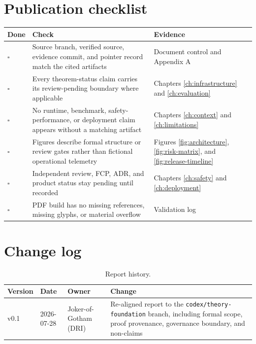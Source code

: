 \label{app:publication}

\section{Publication checklist}

\begin{table}[H]
\centering
\begin{tabularx}{\textwidth}{@{}L{0.08\textwidth}L{0.58\textwidth}Y@{}}
\toprule
{}
\textbf{Done} & \textbf{Check} & \textbf{Evidence} \\
\midrule
\(\square\) & Source branch, verified source, evidence commit, and pointer record match the cited artifacts & Document control and Appendix A \\
\(\square\) & Every theorem-status claim carries its review-pending boundary where applicable & Chapters \ref{ch:infrastructure} and \ref{ch:evaluation} \\
\(\square\) & No runtime, benchmark, safety-performance, or deployment claim appears without a matching artifact & Chapters \ref{ch:context} and \ref{ch:limitations} \\
\(\square\) & Figures describe formal structure or review gates rather than fictional operational telemetry & Figures \ref{fig:architecture}, \ref{fig:risk-matrix}, and \ref{fig:release-timeline} \\
\(\square\) & Independent review, FCP, ADR, and product status stay pending until recorded & Chapters \ref{ch:safety} and \ref{ch:deployment} \\
\(\square\) & PDF build has no missing references, missing glyphs, or material overflow & Validation log \\
\bottomrule
\end{tabularx}
\end{table}

\section{Change log}

\begin{table}[H]
\centering
\caption{Report history.}
\begin{tabularx}{\textwidth}{@{}L{0.14\textwidth}L{0.16\textwidth}L{0.24\textwidth}Y@{}}
\toprule
{}
\textbf{Version} & \textbf{Date} & \textbf{Owner} & \textbf{Change} \\
\midrule
v0.1 & 2026-07-28 & Joker-of-Gotham (DRI) & Re-aligned report to the \texttt{codex/theory-foundation} branch, including formal scope, proof provenance, governance boundary, and non-claims \\
\bottomrule
\end{tabularx}
\end{table}
